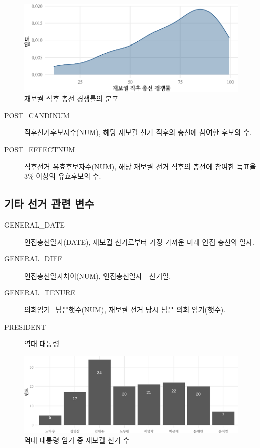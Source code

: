 \documentclass[
  11pt,
  letter]{article}
\begin{document}
\begin{figure}
\centering
\includegraphics{Codebook_national_files/figure-latex/unnamed-chunk-16-1.pdf}
\caption{재보궐 직후 총선 경쟁률의 분포}
\end{figure}

\begin{description}
\item[POST\_CANDINUM]
직후선거후보자수(NUM), 해당 재보궐 선거 직후의 총선에 참여한 후보의 수.
\item[POST\_EFFECTNUM]
직후선거 유효후보자수(NUM), 해당 재보궐 선거 직후의 총선에 참여한 득표율
3\% 이상의 유효후보의 수.
\end{description}

\hypertarget{uxae30uxd0c0-uxc120uxac70-uxad00uxb828-uxbcc0uxc218}{%
\subsection{기타 선거 관련
변수}\label{uxae30uxd0c0-uxc120uxac70-uxad00uxb828-uxbcc0uxc218}}

\begin{description}
\item[GENERAL\_DATE]
인접총선일자(DATE), 재보궐 선거로부터 가장 가까운 미래 인접 총선의 일자.
\item[GENERAL\_DIFF]
인접총선일자차이(NUM), 인접총선일자 - 선거일.
\item[GENERAL\_TENURE]
의회임기\_남은햇수(NUM), 재보궐 선거 당시 남은 의회 임기(햇수).
\item[PRESIDENT]
역대 대통령
\end{description}

\begin{figure}
\centering
\includegraphics{Codebook_national_files/figure-latex/unnamed-chunk-17-1.pdf}
\caption{역대 대통령 임기 중 재보궐 선거 수}
\end{figure}
\end{document}
